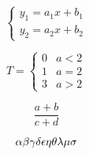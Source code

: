 \documentclass[UTF8,a4paper,12pt]{ctexart}
\begin{document}
\begin{equation}
    \left \{
        \begin{gathered}
            y_1 = a_1x + b_1\\
            y_2 = a_2x + b_2
        \end{gathered}
    \right .
\end{equation}

\begin{equation}
    T= 
        \begin{cases}
            0 & a<2\\
            1 & a=2\\
            3 & a>2
        \end{cases}
\end{equation}

\begin{equation} 
    \frac{a+b}{c+d} %
\end{equation}

\begin{equation}
    \alpha\\
    \beta
    \gamma
    \delta
    \epsilon
    \eta
    \theta
    \lambda
    \mu
    \sigma
\end{equation}
\end{document}
